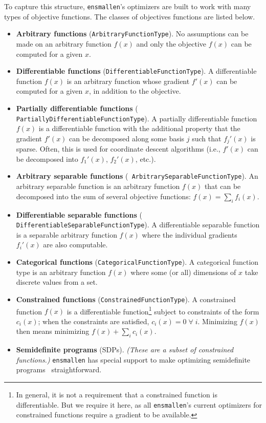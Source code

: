 To capture this structure, {\tt ensmallen}'s optimizers are built to work with
many types of objective functions.  The classes of objectives functions
are listed below.

\begin{itemize}
\item {\bf Arbitrary functions} ({\tt ArbitraryFunctionType}).  No
assumptions can be made on an arbitrary function $f(x)$ and only the objective
$f(x)$ can be computed for a given $x$.

\item {\bf Differentiable functions} ({\tt DifferentiableFunctionType}).
A differentiable function $f(x)$ is an arbitrary function whose gradient $f'(x)$
can be computed for a given $x$, in addition to the objective.

\item {\bf Partially differentiable functions} ({\tt
PartiallyDifferentiableFunctionType}).  A partially differentiable function
$f(x)$ is a differentiable function with the additional property that the
gradient $f'(x)$ can be decomposed along some basis $j$ such that $f_j'(x)$ is
sparse.  Often, this is used for coordinate descent algorithms (i.e., $f'(x)$
can be decomposed into $f_{1}'(x)$, $f_{2}'(x)$, etc.).

\item {\bf Arbitrary separable functions} ({\tt
ArbitrarySeparableFunctionType}).  An arbitrary separable function is an
arbitrary function $f(x)$ that can be decomposed into the sum of several
objective functions: $f(x) = \sum\nolimits_i f_i(x)$.

\item {\bf Differentiable separable functions} ({\tt
DifferentiableSeparableFunctionType}).  A differentiable separable function is a
separable arbitrary function $f(x)$ where the individual gradients $f_i'(x)$ are
also computable.

\item {\bf Categorical functions} ({\tt CategoricalFunctionType}).  A
categorical function type is an arbitrary function $f(x)$ where some (or all)
dimensions of $x$ take discrete values from a set.

\item {\bf Constrained functions} ({\tt ConstrainedFunctionType}).  A
constrained function $f(x)$ is a differentiable function\footnote{In general, it
is not a requirement that a constrained function is differentiable.  But we
require it here, as all {\tt ensmallen}'s current optimizers for constrained
functions require a gradient to be available.} subject to constraints of the
form $c_i(x)$; when the constraints are satisfied, $c_i(x) = 0\; \forall \; i$.
Minimizing $f(x)$ then means minimizing $f(x) + \sum_i c_i(x)$.

\item {\bf Semidefinite programs} (SDPs).  {\it (These are a subset of
constrained functions.)}  {\tt ensmallen} has special
support to make optimizing semidefinite
programs~\cite{vandenberghe1996semidefinite} straightforward.
\end{itemize}

